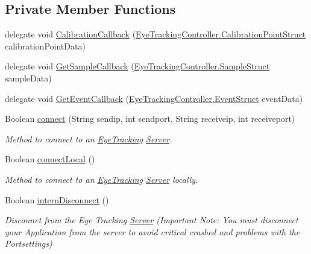 \subsection*{Private Member Functions}
\begin{DoxyCompactItemize}
\item 
delegate void \hyperlink{class_web_analyzer_1_1_eye_tracking_1_1_eye_tracking_model_ad6c2f20511c53eaf55a8fb18d263b51c}{Calibration\+Callback} (\hyperlink{struct_web_analyzer_1_1_eye_tracking_1_1_eye_tracking_controller_1_1_calibration_point_struct}{Eye\+Tracking\+Controller.\+Calibration\+Point\+Struct} calibration\+Point\+Data)
\item 
delegate void \hyperlink{class_web_analyzer_1_1_eye_tracking_1_1_eye_tracking_model_afa0ffe40b73c90761f49dec896df4baa}{Get\+Sample\+Callback} (\hyperlink{struct_web_analyzer_1_1_eye_tracking_1_1_eye_tracking_controller_1_1_sample_struct}{Eye\+Tracking\+Controller.\+Sample\+Struct} sample\+Data)
\item 
delegate void \hyperlink{class_web_analyzer_1_1_eye_tracking_1_1_eye_tracking_model_a40785479d78104c591e53c7e2847e9ff}{Get\+Event\+Callback} (\hyperlink{struct_web_analyzer_1_1_eye_tracking_1_1_eye_tracking_controller_1_1_event_struct}{Eye\+Tracking\+Controller.\+Event\+Struct} event\+Data)
\item 
Boolean \hyperlink{class_web_analyzer_1_1_eye_tracking_1_1_eye_tracking_model_a6e9342c234b6000ba68c03464acb0f50}{connect} (String sendip, int sendport, String receiveip, int receiveport)
\begin{DoxyCompactList}\small\item\em Method to connect to an \hyperlink{namespace_web_analyzer_1_1_eye_tracking}{Eye\+Tracking} \hyperlink{namespace_web_analyzer_1_1_server}{Server}. \end{DoxyCompactList}\item 
Boolean \hyperlink{class_web_analyzer_1_1_eye_tracking_1_1_eye_tracking_model_a95814ec9f1a4f0d5da70a78c50dd9e22}{connect\+Local} ()
\begin{DoxyCompactList}\small\item\em Method to connect to an \hyperlink{namespace_web_analyzer_1_1_eye_tracking}{Eye\+Tracking} \hyperlink{namespace_web_analyzer_1_1_server}{Server} locally. \end{DoxyCompactList}\item 
Boolean \hyperlink{class_web_analyzer_1_1_eye_tracking_1_1_eye_tracking_model_ac71c3384b693045561ec20be26951fc6}{intern\+Disconnect} ()
\begin{DoxyCompactList}\small\item\em Disconnet from the Eye Tracking \hyperlink{namespace_web_analyzer_1_1_server}{Server} (Important Note\+: You must disconnect your Application from the server to avoid critical crashed and problems with the Portsettings) \end{DoxyCompactList}\item 

\end{DoxyCompactItemize}
